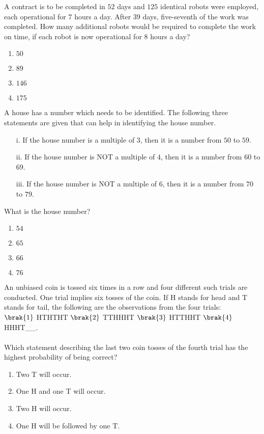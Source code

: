     \item A contract is to be completed in $52$ days and $125$ identical robots were employed, each operational for $7$ hours a day. After $39$ days, five-seventh of the work was completed. How many additional robots would be required to complete the work on time, if each robot is now operational for 8 hours a day?
        \begin{enumerate}
            \item $50$
            \item $89$
            \item $146$
            \item $175$
        \end{enumerate}

    \item A house has a number which needs to be identified. The following three statements are given that can help in identifying the house number.
        \begin{itemize}
            \item[i.] If the house number is a multiple of $3$, then it is a number from $50$ to $59$.
            \item[ii.] If the house number is NOT a multiple of $4$, then it is a number from $60$ to $69$.
            \item[iii.] If the house number is NOT a multiple of $6$, then it is a number from $70$ to $79$.
        \end{itemize}
        What is the house number?
        \begin{enumerate}
            \item $54$
            \item $65$
            \item $66$
            \item $76$
        \end{enumerate}

    \item \label{10} An unbiased coin is tossed six times in a row and four different such trials are conducted. One trial implies six tosses of the coin. If H stands for head and T stands for tail, the following are the observations from the four trials: \\ $\brak{1}$ HTHTHT $\brak{2}$ TTHHHT $\brak{3}$ HTTHHT $\brak{4}$ HHHT\_\_. \\ \\ Which statement describing the last two coin tosses of the fourth trial has the highest probability of being correct?
        \begin{enumerate}
            \item Two T will occur.
            \item One H and one T will occur.
            \item Two H will occur.
            \item One H will be followed by one T.
        \end{enumerate}

